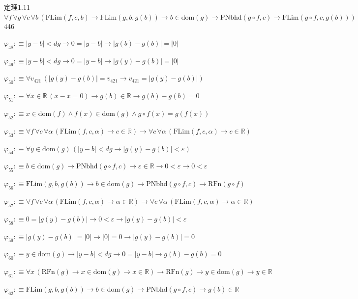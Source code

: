 \begin{fullproof}{定理1.11}{$\forall f\,\forall g\,\forall c\,\forall b\,(\mathrm{FLim}(f,c,b) \to \mathrm{FLim}(g,b,g(b)) \to b \in \mathrm{dom}(g) \to \mathrm{PNbhd}(g \circ f,c) \to \mathrm{FLim}(g \circ f,c,g(b)))$}{446}
\begin{abbrevlist}
\item $\varphi_{48} :\equiv \lvert y - b \rvert < \mathit{dg} \to 0 = \lvert y - b \rvert \to \lvert g(b) - g(b) \rvert = \lvert 0 \rvert$
\item $\varphi_{49} :\equiv \lvert y - b \rvert < \mathit{dg} \to 0 = \lvert y - b \rvert \to \lvert g(y) - g(b) \rvert = \lvert 0 \rvert$
\item $\varphi_{50} :\equiv \forall v_{421}\,(\lvert g(y) - g(b) \rvert = v_{421} \to v_{421} = \lvert g(y) - g(b) \rvert)$
\item $\varphi_{51} :\equiv \forall x \in \mathbb{R}\,(x - x = 0) \to g(b) \in \mathbb{R} \to g(b) - g(b) = 0$
\item $\varphi_{52} :\equiv x \in \mathrm{dom}(f) \land f(x) \in \mathrm{dom}(g) \land g \circ f(x) = g(f(x))$
\item $\varphi_{53} :\equiv \forall f\,\forall c\,\forall \alpha\,(\mathrm{FLim}(f,c,\alpha) \to c \in \mathbb{R}) \to \forall c\,\forall \alpha\,(\mathrm{FLim}(f,c,\alpha) \to c \in \mathbb{R})$
\item $\varphi_{54} :\equiv \forall y \in \mathrm{dom}(g)\,(\lvert y - b \rvert < \mathit{dg} \to \lvert g(y) - g(b) \rvert < \varepsilon)$
\item $\varphi_{55} :\equiv b \in \mathrm{dom}(g) \to \mathrm{PNbhd}(g \circ f,c) \to \varepsilon \in \mathbb{R} \to 0 < \varepsilon \to 0 < \varepsilon$
\item $\varphi_{56} :\equiv \mathrm{FLim}(g,b,g(b)) \to b \in \mathrm{dom}(g) \to \mathrm{PNbhd}(g \circ f,c) \to \mathrm{RFn}(g \circ f)$
\item $\varphi_{57} :\equiv \forall f\,\forall c\,\forall \alpha\,(\mathrm{FLim}(f,c,\alpha) \to \alpha \in \mathbb{R}) \to \forall c\,\forall \alpha\,(\mathrm{FLim}(f,c,\alpha) \to \alpha \in \mathbb{R})$
\item $\varphi_{58} :\equiv 0 = \lvert g(y) - g(b) \rvert \to 0 < \varepsilon \to \lvert g(y) - g(b) \rvert < \varepsilon$
\item $\varphi_{59} :\equiv \lvert g(y) - g(b) \rvert = \lvert 0 \rvert \to \lvert 0 \rvert = 0 \to \lvert g(y) - g(b) \rvert = 0$
\item $\varphi_{60} :\equiv y \in \mathrm{dom}(g) \to \lvert y - b \rvert < \mathit{dg} \to 0 = \lvert y - b \rvert \to g(b) - g(b) = 0$
\item $\varphi_{61} :\equiv \forall x\,(\mathrm{RFn}(g) \to x \in \mathrm{dom}(g) \to x \in \mathbb{R}) \to \mathrm{RFn}(g) \to y \in \mathrm{dom}(g) \to y \in \mathbb{R}$
\item $\varphi_{62} :\equiv \mathrm{FLim}(g,b,g(b)) \to b \in \mathrm{dom}(g) \to \mathrm{PNbhd}(g \circ f,c) \to g(b) \in \mathbb{R}$

\end{abbrevlist}
\end{fullproof}
